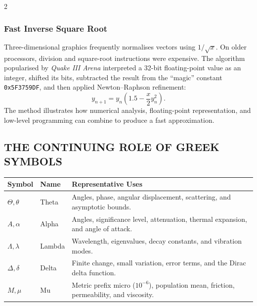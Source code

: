 \begin{multicols}{2}
  \vspace*{-6pt}
  \subsubsection*{Fast Inverse Square Root}
  Three-dimensional graphics frequently normalises vectors using $1/\sqrt{x}$. On older processors, division and square-root instructions were expensive. The algorithm popularised by \textit{Quake III Arena} interpreted a 32-bit floating-point value as an integer, shifted its bits, subtracted the result from the “magic” constant \texttt{0x5F3759DF}, and then applied Newton--Raphson refinement:
  \[
    y_{n+1}=y_n\left(1.5-\frac{x}{2}y_n^2\right).
  \]
  The method illustrates how numerical analysis, floating-point representation, and low-level programming can combine to produce a fast approximation.

  \subsection*{\centering\uppercase{The Continuing Role of Greek Symbols}}

{\setlength{\abovecaptionskip}{4pt}\setlength{\belowcaptionskip}{4pt}
\begin{center}
\vspace{-1.2em}
\begin{minipage}{0.98\columnwidth}
\centering
    \scriptsize
    \setlength{\tabcolsep}{3pt}
    \renewcommand{\arraystretch}{1.15}
    \begin{tabular}{@{}>{\Centering\arraybackslash}p{}
                        >{\RaggedRight\arraybackslash}p{}
                        >{\RaggedRight\arraybackslash}p{}@{}}
      \toprule
      \textbf{Symbol} & \textbf{Name} & \textbf{Representative Uses} \\
      \midrule
      $\Theta,\theta$ & Theta & Angles, phase, angular displacement, scattering, and asymptotic bounds. \\
      $A,\alpha$ & Alpha & Angles, significance level, attenuation, thermal expansion, and angle of attack. \\
      $\Lambda,\lambda$ & Lambda & Wavelength, eigenvalues, decay constants, and vibration modes. \\
      $\Delta,\delta$ & Delta & Finite change, small variation, error terms, and the Dirac delta function. \\
      $M,\mu$ & Mu & Metric prefix micro ($10^{-6}$), population mean, friction, permeability, and viscosity. \\
      \bottomrule
    \end{tabular}
\end{minipage}
  \end{center}
}


\end{multicols}
